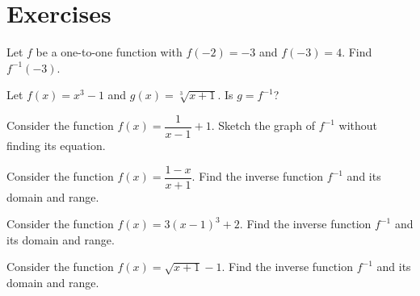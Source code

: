 \newpage

\section*{Exercises}

\begin{exercise}
  Let $f$ be a one-to-one function with \(f(-2)=-3\) and \(f(-3)=4\). Find $f^{-1}(-3)$.
\end{exercise}

\begin{exercise}
  Let \(f(x)=x^3-1\) and \(g(x)=\sqrt[3]{x+1}\). Is \(g=f^{-1}\)?
\end{exercise}

\begin{exercise}
  Consider the function $f(x)=\dfrac{1}{x-1}+1$. Sketch the graph of $f^{-1}$ without finding its equation.
\end{exercise}

\newpage

\begin{exercise}
  Consider the function $f(x)=\dfrac{1-x}{x+1}$. Find the inverse function $f^{-1}$ and its domain and range.
\end{exercise}

\begin{exercise}
  Consider the function $f(x)=3(x-1)^3+2$. Find the inverse function $f^{-1}$ and its domain and range.
\end{exercise}

\begin{exercise}
  Consider the function $f(x)=\sqrt{x+1}-1$. Find the inverse function $f^{-1}$ and its domain and range.
\end{exercise}
